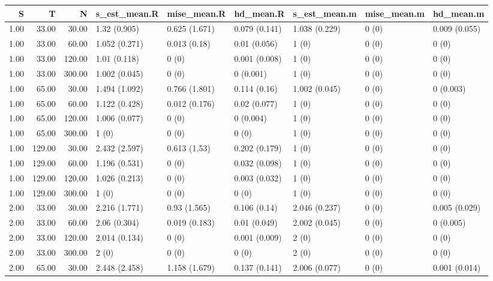 \begin{table}[ht]
\centering
\begin{tabular}{rrrllllll}
  \hline
S & T & N & s\_est\_mean.R & mise\_mean.R & hd\_mean.R & s\_est\_mean.m & mise\_mean.m & hd\_mean.m \\ 
  \hline
1.00 & 33.00 & 30.00 & 1.32 (0.905) & 0.625 (1.671) & 0.079 (0.141) & 1.038 (0.229) & 0 (0) & 0.009 (0.055) \\ 
  1.00 & 33.00 & 60.00 & 1.052 (0.271) & 0.013 (0.18) & 0.01 (0.056) & 1 (0) & 0 (0) & 0 (0) \\ 
  1.00 & 33.00 & 120.00 & 1.01 (0.118) & 0 (0) & 0.001 (0.008) & 1 (0) & 0 (0) & 0 (0) \\ 
  1.00 & 33.00 & 300.00 & 1.002 (0.045) & 0 (0) & 0 (0.001) & 1 (0) & 0 (0) & 0 (0) \\ 
  1.00 & 65.00 & 30.00 & 1.494 (1.092) & 0.766 (1.801) & 0.114 (0.16) & 1.002 (0.045) & 0 (0) & 0 (0.003) \\ 
  1.00 & 65.00 & 60.00 & 1.122 (0.428) & 0.012 (0.176) & 0.02 (0.077) & 1 (0) & 0 (0) & 0 (0) \\ 
  1.00 & 65.00 & 120.00 & 1.006 (0.077) & 0 (0) & 0 (0.004) & 1 (0) & 0 (0) & 0 (0) \\ 
  1.00 & 65.00 & 300.00 & 1 (0) & 0 (0) & 0 (0) & 1 (0) & 0 (0) & 0 (0) \\ 
  1.00 & 129.00 & 30.00 & 2.432 (2.597) & 0.613 (1.53) & 0.202 (0.179) & 1 (0) & 0 (0) & 0 (0) \\ 
  1.00 & 129.00 & 60.00 & 1.196 (0.531) & 0 (0) & 0.032 (0.098) & 1 (0) & 0 (0) & 0 (0) \\ 
  1.00 & 129.00 & 120.00 & 1.026 (0.213) & 0 (0) & 0.003 (0.032) & 1 (0) & 0 (0) & 0 (0) \\ 
  1.00 & 129.00 & 300.00 & 1 (0) & 0 (0) & 0 (0) & 1 (0) & 0 (0) & 0 (0) \\ 
  2.00 & 33.00 & 30.00 & 2.216 (1.771) & 0.93 (1.565) & 0.106 (0.14) & 2.046 (0.237) & 0 (0) & 0.005 (0.029) \\ 
  2.00 & 33.00 & 60.00 & 2.06 (0.304) & 0.019 (0.183) & 0.01 (0.049) & 2.002 (0.045) & 0 (0) & 0 (0.005) \\ 
  2.00 & 33.00 & 120.00 & 2.014 (0.134) & 0 (0) & 0.001 (0.009) & 2 (0) & 0 (0) & 0 (0) \\ 
  2.00 & 33.00 & 300.00 & 2 (0) & 0 (0) & 0 (0) & 2 (0) & 0 (0) & 0 (0) \\ 
  2.00 & 65.00 & 30.00 & 2.448 (2.458) & 1.158 (1.679) & 0.137 (0.141) & 2.006 (0.077) & 0 (0) & 0.001 (0.014) \\ 

\end{tabular}
\end{table}

